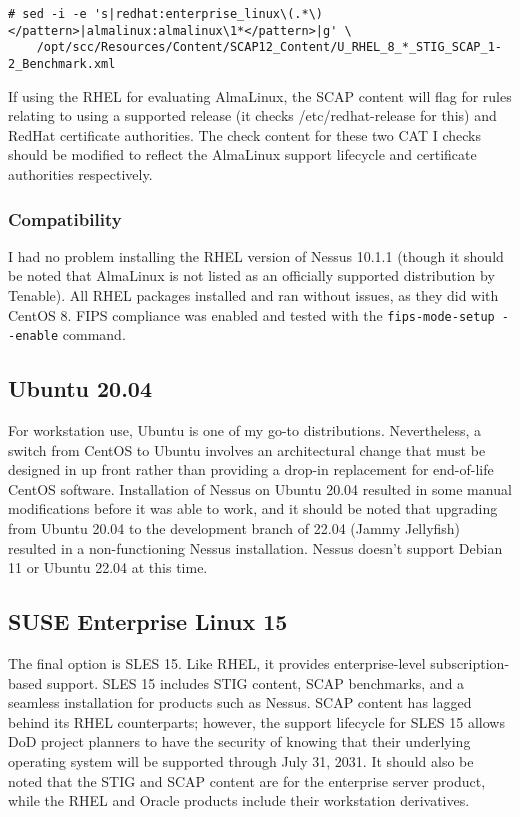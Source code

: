 \begin{lstlisting}[caption={Modify RHEL Benchmark for AlmaLinux},captionpos=b,style=BashStyle,basicstyle=\small,label={lst:20220321:alma},literate=*{-}{-}1,breaklines=true]
# sed -i -e 's|redhat:enterprise_linux\(.*\)</pattern>|almalinux:almalinux\1*</pattern>|g' \
	/opt/scc/Resources/Content/SCAP12_Content/U_RHEL_8_*_STIG_SCAP_1-2_Benchmark.xml
\end{lstlisting}

If using the RHEL for evaluating AlmaLinux, the SCAP content will flag for rules relating to using a supported release (it checks /etc/redhat-release for this) and RedHat certificate authorities. The check content for these two CAT I checks should be modified to reflect the AlmaLinux support lifecycle and certificate authorities respectively.

\subsubsection{Compatibility}
I had no problem installing the RHEL version of Nessus 10.1.1 (though it should be noted that AlmaLinux is not listed as an officially supported distribution by Tenable). All RHEL packages installed and ran without issues, as they did with CentOS 8. FIPS compliance was enabled and tested with the \texttt{fips-mode-setup -{}-enable} command.

\subsection{Ubuntu 20.04}

For workstation use, Ubuntu is one of my go-to distributions. Nevertheless, a switch from CentOS to Ubuntu involves an architectural change that must be designed in up front rather than providing a drop-in replacement for end-of-life CentOS software. Installation of Nessus on Ubuntu 20.04 resulted in some manual modifications before it was able to work, and it should be noted that upgrading from Ubuntu 20.04 to the development branch of 22.04 (Jammy Jellyfish) resulted in a non-functioning Nessus installation. Nessus doesn't support Debian 11 or Ubuntu 22.04 at this time.

\subsection{SUSE Enterprise Linux 15}

The final option is SLES 15. Like RHEL, it provides enterprise-level subscription-based support. SLES 15 includes STIG content, SCAP benchmarks, and a seamless installation for products such as Nessus. SCAP content has lagged behind its RHEL counterparts; however, the support lifecycle for SLES 15 allows DoD project planners to have the security of knowing that their underlying operating system will be supported through July 31, 2031. It should also be noted that the STIG and SCAP content are for the enterprise server product, while the RHEL and Oracle products include their workstation derivatives.

